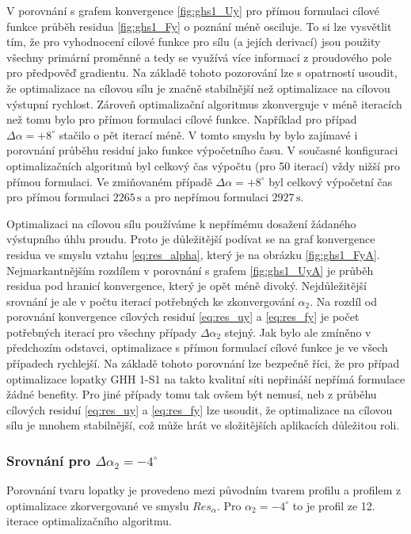 V porovnání s grafem konvergence \ref{fig:ghs1_Uy} pro přímou formulaci cílové funkce průběh residua \ref{fig:ghs1_Fy} o poznání méně osciluje. To si lze vysvětlit tím, že pro vyhodnocení cílové funkce pro sílu (a jejích derivací) jsou použity všechny primární proměnné a tedy se využívá více informací z proudového pole pro předpověď gradientu. Na základě tohoto pozorování lze s opatrností usoudit, že optimalizace na cílovou sílu je značně stabilnější než optimalizace na cílovou výstupní rychlost. Zároveň optimalizační algoritmus zkonverguje v méně iteracích než tomu bylo pro přímou formulaci cílové funkce. Například pro případ $ \Delta \alpha = +8^\circ $ stačilo o pět iterací méně. V tomto smyslu by bylo zajímavé i porovnání průběhu residuí jako funkce výpočetního času. V současné konfiguraci optimalizačních algoritmů byl celkový čas výpočtu (pro 50 iterací) vždy nižší pro přímou formulaci. Ve zmiňovaném případě $ \Delta \alpha = +8^\circ $ byl celkový výpočetní čas pro přímou formulaci $ 2265 \,\mathrm{s} $ a pro nepřímou formulaci $ 2927 \,\mathrm{s} $.

Optimalizaci na cílovou sílu používáme k nepřímému dosažení žádaného výstupního úhlu proudu. Proto je důležitější podívat se na graf konvergence residua ve smyslu vztahu \ref{eq:res_alpha}, který je na obrázku \ref{fig:ghs1_FyA}. Nejmarkantnějším rozdílem v porovnání s grafem \ref{fig:ghs1_UyA} je průběh residua pod hranicí konvergence, který je opět méně divoký. Nejdůležitější srovnání je ale v počtu iterací potřebných ke zkonvergování $ \alpha_2 $. Na rozdíl od porovnání konvergence cílových residuí \ref{eq:res_uy} a \ref{eq:res_fy} je počet potřebných iterací pro všechny případy $ \Delta\alpha_2 $ stejný. Jak bylo ale zmíněno v předchozím odstavci, optimalizace s přímou formulací cílové funkce je ve všech případech rychlejší. Na základě tohoto porovnání lze bezpečně říci, že pro případ optimalizace lopatky GHH 1-S1 na takto kvalitní síti nepřináší nepřímá formulace žádné benefity. Pro jiné případy tomu tak ovšem být nemusí, neb z průběhu cílových residuí \ref{eq:res_uy} a \ref{eq:res_fy} lze usoudit, že optimalizace na cílovou sílu je mnohem stabilnější, což může hrát ve složitějších aplikacích důležitou roli.

\subsubsection{Srovnání pro $ \Delta \alpha_2=-4^{\circ} $}

Porovnání tvaru lopatky je provedeno mezi původním tvarem profilu a profilem z optimalizace zkorvergované ve smyslu $ Res_{\alpha} $. Pro $ \alpha_2=-4^\circ $ to je profil ze 12. iterace optimalizačního algoritmu.

